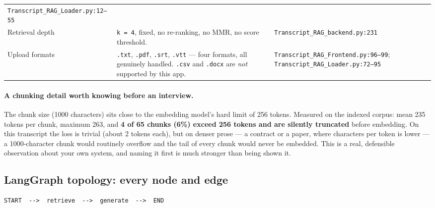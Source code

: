 \documentclass[11pt,a4paper]{article}
\begin{document}
\begin{longtable}{@{}p{3.6cm}p{7.3cm}p{4.6cm}@{}}
\texttt{Transcript\_RAG\_Loader.py:12--55} \\
\addlinespace
Retrieval depth &
\texttt{k = 4}, fixed, no re-ranking, no MMR, no score threshold. &
\texttt{Transcript\_RAG\_backend.py:231} \\
\addlinespace
Upload formats &
\texttt{.txt}, \texttt{.pdf}, \texttt{.srt}, \texttt{.vtt} --- four formats, all
genuinely handled. \texttt{.csv} and \texttt{.docx} are \emph{not} supported by
this app. &
\texttt{Transcript\_RAG\_Frontend.py:96--99};\newline
\texttt{Transcript\_RAG\_Loader.py:72--95} \\
\bottomrule
\end{longtable}

\paragraph{A chunking detail worth knowing before an interview.}
The chunk size (1000 characters) sits close to the embedding model's hard limit
of 256 tokens. Measured on the indexed corpus: mean 235 tokens per chunk, maximum
263, and \textbf{4 of 65 chunks (6\%) exceed 256 tokens and are silently
truncated} before embedding. On this transcript the loss is trivial (about 2
tokens each), but on denser prose --- a contract or a paper, where characters per
token is lower --- a 1000-character chunk would routinely overflow and the tail of
every chunk would never be embedded. This is a real, defensible observation about
your own system, and naming it first is much stronger than being shown it.

\subsection{LangGraph topology: every node and edge}

\begin{lstlisting}
START  -->  retrieve  -->  generate  -->  END
\end{lstlisting}
\end{document}
